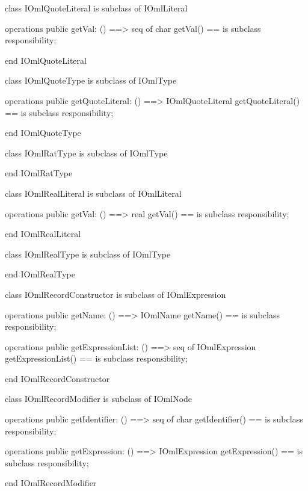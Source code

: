 \begin{vdm_al}
class IOmlQuoteLiteral
 is subclass of IOmlLiteral

operations
  public getVal: () ==> seq of char
  getVal() == is subclass responsibility;

end IOmlQuoteLiteral
\end{vdm_al}

\begin{vdm_al}
class IOmlQuoteType
 is subclass of IOmlType

operations
  public getQuoteLiteral: () ==> IOmlQuoteLiteral
  getQuoteLiteral() == is subclass responsibility;

end IOmlQuoteType
\end{vdm_al}

\begin{vdm_al}
class IOmlRatType
 is subclass of IOmlType

end IOmlRatType
\end{vdm_al}

\begin{vdm_al}
class IOmlRealLiteral
 is subclass of IOmlLiteral

operations
  public getVal: () ==> real
  getVal() == is subclass responsibility;

end IOmlRealLiteral
\end{vdm_al}

\begin{vdm_al}
class IOmlRealType
 is subclass of IOmlType

end IOmlRealType
\end{vdm_al}

\begin{vdm_al}
class IOmlRecordConstructor
 is subclass of IOmlExpression

operations
  public getName: () ==> IOmlName
  getName() == is subclass responsibility;

operations
  public getExpressionList: () ==> seq of IOmlExpression
  getExpressionList() == is subclass responsibility;

end IOmlRecordConstructor
\end{vdm_al}

\begin{vdm_al}
class IOmlRecordModifier
 is subclass of IOmlNode

operations
  public getIdentifier: () ==> seq of char
  getIdentifier() == is subclass responsibility;

operations
  public getExpression: () ==> IOmlExpression
  getExpression() == is subclass responsibility;

end IOmlRecordModifier
\end{vdm_al}


